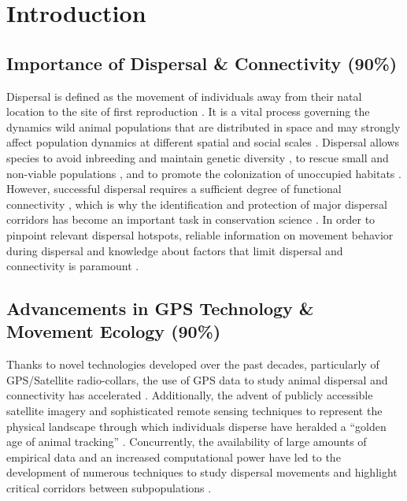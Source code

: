 \documentclass[abstract=on,10pt,a4paper,bibliography=totocnumbered]{article}
\begin{document}
\newpage

\onehalfspacing
\tableofcontents
\doublespacing

\newpage
{}

\linenumbers

\section{Introduction}

\subsection{Importance of Dispersal \& Connectivity (90\%)}
Dispersal is defined as the movement of individuals away from their natal
location to the site of first reproduction \cite{Howard.1960}. It is a vital
process governing the dynamics wild animal populations that are distributed in
space \citep{Hanski.1998, Clobert.2012} and may strongly affect population
dynamics at different spatial and social scales \citep{Hanski.1999a,
Clobert.2012}. Dispersal allows species to avoid inbreeding and maintain genetic
diversity \citep{Perrin.1999, Perrin.2000, Frankham.2002, Leigh.2012,
Baguette.2013}, to rescue small and non-viable populations \citep{Brown.1977},
and to promote the colonization of unoccupied habitats \citep{Hanski.1999b,
MacArthur.2001}. However, successful dispersal requires a sufficient degree of
functional connectivity \citep{Fahrig.2003, Clobert.2012}, which is why the
identification and protection of major dispersal corridors has become an
important task in conservation science \citep{Doerr.2011, Rudnick.2012}. In
order to pinpoint relevant dispersal hotspots, reliable information on movement
behavior during dispersal and knowledge about factors that limit dispersal and
connectivity is paramount \citep{Baguette.2013, Vasudev.2015}.

\subsection{Advancements in GPS Technology \& Movement Ecology (90\%)}
Thanks to novel technologies developed over the past decades, particularly of
GPS/Satellite radio-collars, the use of GPS data to study animal dispersal and
connectivity has accelerated \citep{Elliot.2014, Jonsson.2016, Williams.2019}.
Additionally, the advent of publicly accessible satellite imagery and
sophisticated remote sensing techniques to represent the physical landscape
through which individuals disperse have heralded a ``golden age of animal
tracking'' \citep{Kays.2015}. Concurrently, the availability of large amounts of
empirical data and an increased computational power have led to the development
of numerous techniques to study dispersal movements and highlight critical
corridors between subpopulations \citep{Boyce.2002, Fortin.2005, Cushman.2010,
Zeller.2012, Diniz.2020}.
\end{document}
